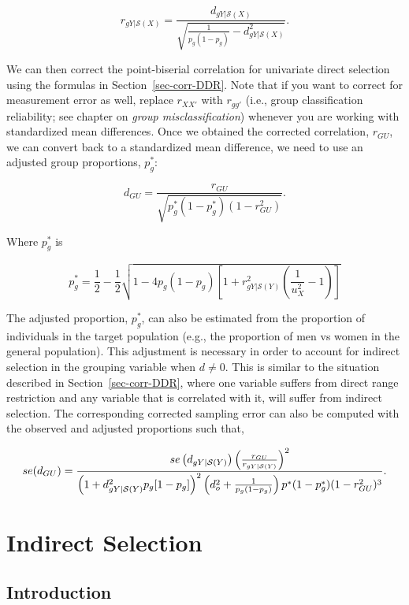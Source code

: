 \documentclass[
  letterpaper,
  DIV=11,
  numbers=noendperiod]{scrreprt}
\begin{document}
\[
r_{gY|\mathcal{S}(X)} = \frac{d_{gY|\mathcal{S}(X)}}{\sqrt{\frac{1}{p_g(1-p_g)}-d_{gY|\mathcal{S}(X)}^2}}.
\]

We can then correct the point-biserial correlation for univariate direct
selection using the formulas in Section~\ref{sec-corr-DDR}. Note that if
you want to correct for measurement error as well, replace \(r_{XX'}\)
with \(r_{gg'}\) (i.e., group classification reliability; see chapter on
\emph{group misclassification}) whenever you are working with
standardized mean differences. Once we obtained the corrected
correlation, \(r_{GU}\), we can convert back to a standardized mean
difference, we need to use an adjusted group proportions, \(p_g^*\):

\[
d_{GU} = \frac{r_{GU}}{\sqrt{p_g^*\left(1-p_g^*\right)\left(1-r_{GU}^2\right)}}.
\]

Where \(p_g^*\) is

\[
p_g^* = \frac{1}{2}-\frac{1}{2}\sqrt{1-4p_g(1-p_g)\left[1+r_{gY|\mathcal{S}(Y)}^2\left(\frac{1}{u^2_X}-1\right)\right]}
\]

The adjusted proportion, \(p_g^*\), can also be estimated from the
proportion of individuals in the target population (e.g., the proportion
of men vs women in the general population). This adjustment is necessary
in order to account for indirect selection in the grouping variable when
\(d\neq 0\). This is similar to the situation described in
Section~\ref{sec-corr-DDR}, where one variable suffers from direct range
restriction and any variable that is correlated with it, will suffer
from indirect selection. The corresponding corrected sampling error can
also be computed with the observed and adjusted proportions such that,

\[
\small{se(d_{GU}) = \frac {se\left(d_{gY|\mathcal{S}(Y)}\right)\left(\frac{r_{GU}}{r_{gY|\mathcal{S}(Y)}}\right)^2} {\left(1+d_{gY|\mathcal{S}(Y)}^2p_g[1-p_g]\right)^2\left(d_o^2+\frac{1}{p_g(1-p_g)}\right)p^*(1-p_g^*)(1-r_{GU}^2)^3}.}
\]


\chapter{Indirect Selection}\label{indirect-selection}

\section{Introduction}\label{introduction-7}
\end{document}
